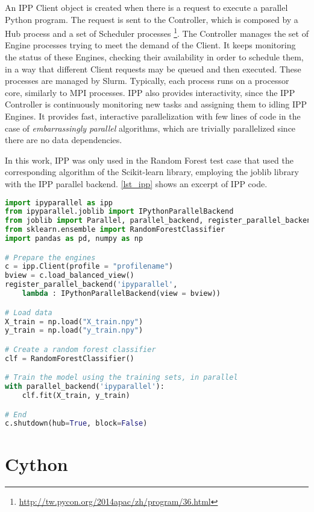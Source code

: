 An IPP Client object is created when there is a request to execute a parallel Python program. The request is sent to the Controller, which is composed by a Hub process and a set of Scheduler processes \footnote{\url{http://tw.pycon.org/2014apac/zh/program/36.html}}. The Controller manages the set of Engine processes trying to meet the demand of the Client. It keeps monitoring the status of these Engines, checking their availability in order to schedule them, in a way that different Client requests may be queued and then executed. These processes are managed by Slurm. Typically, each process runs on a processor core, similarly to MPI processes. IPP also provides interactivity, since the IPP Controller is continuously monitoring new tasks and assigning them to idling IPP Engines. It provides fast, interactive parallelization with few lines of code in the case of \textit {embarrassingly parallel} algorithms, which are trivially parallelized since there are no data dependencies. 

In this work, IPP was only used in the Random Forest test case that used the corresponding algorithm of the Scikit-learn library, employing the joblib library with the IPP parallel backend. \autoref {lst_ipp} shows an excerpt of IPP code.

\begin{lstlisting}[float=htb, language={Python}, label={lst_ipp}, caption={Excerpt of IPP code.}]
import ipyparallel as ipp
from ipyparallel.joblib import IPythonParallelBackend
from joblib import Parallel, parallel_backend, register_parallel_backend
from sklearn.ensemble import RandomForestClassifier
import pandas as pd, numpy as np

# Prepare the engines
c = ipp.Client(profile = "profilename")
bview = c.load_balanced_view()
register_parallel_backend('ipyparallel',
    lambda : IPythonParallelBackend(view = bview))

# Load data
X_train = np.load("X_train.npy")
y_train = np.load("y_train.npy")

# Create a random forest classifier
clf = RandomForestClassifier()

# Train the model using the training sets, in parallel
with parallel_backend('ipyparallel'):
    clf.fit(X_train, y_train)

# End
c.shutdown(hub=True, block=False)
\end{lstlisting}

%
%
%
\section{Cython}
\label{sec_apprcyth}

